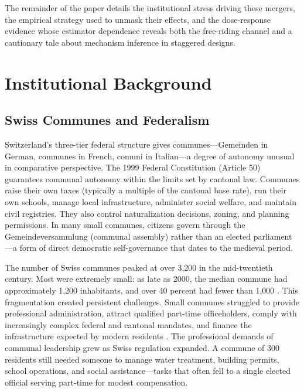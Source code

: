 \documentclass[12pt]{article}
\begin{document}
The remainder of the paper details the institutional stress driving these mergers, the empirical strategy used to unmask their effects, and the dose-response evidence whose estimator dependence reveals both the free-riding channel and a cautionary tale about mechanism inference in staggered designs.


\section{Institutional Background}

\subsection{Swiss Communes and Federalism}

Switzerland's three-tier federal structure gives communes---Gemeinden in German, communes in French, comuni in Italian---a degree of autonomy unusual in comparative perspective. The 1999 Federal Constitution (Article 50) guarantees communal autonomy within the limits set by cantonal law. Communes raise their own taxes (typically a multiple of the cantonal base rate), run their own schools, manage local infrastructure, administer social welfare, and maintain civil registries. They also control naturalization decisions, zoning, and planning permissions. In many small communes, citizens govern through the Gemeindeversammlung (communal assembly) rather than an elected parliament---a form of direct democratic self-governance that dates to the medieval period.

The number of Swiss communes peaked at over 3,200 in the mid-twentieth century. Most were extremely small: as late as 2000, the median commune had approximately 1,200 inhabitants, and over 40 percent had fewer than 1,000 \citep{ladner2002size}. This fragmentation created persistent challenges. Small communes struggled to provide professional administration, attract qualified part-time officeholders, comply with increasingly complex federal and cantonal mandates, and finance the infrastructure expected by modern residents \citep{steiner2003causes}. The professional demands of communal leadership grew as Swiss regulation expanded. A commune of 300 residents still needed someone to manage water treatment, building permits, school operations, and social assistance---tasks that often fell to a single elected official serving part-time for modest compensation.
\end{document}
